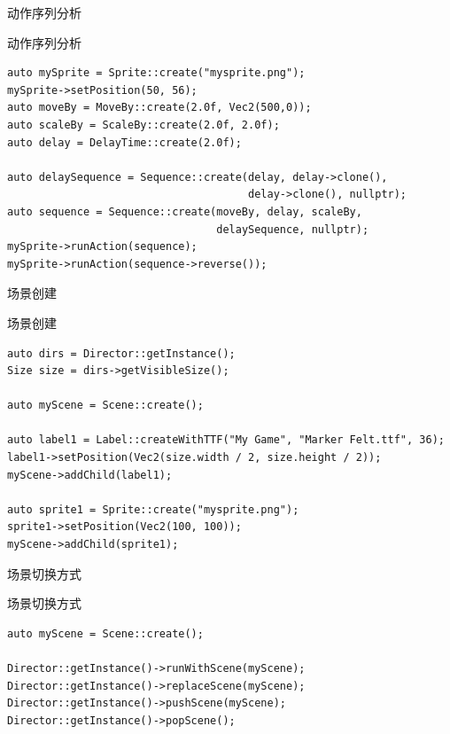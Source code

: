 \documentclass{beamer}
\begin{document}

\begin{frame}[fragile]{动作序列分析}
\begin{block}{动作序列分析}
\begin{verbatim}
auto mySprite = Sprite::create("mysprite.png");
mySprite->setPosition(50, 56);
auto moveBy = MoveBy::create(2.0f, Vec2(500,0));
auto scaleBy = ScaleBy::create(2.0f, 2.0f);
auto delay = DelayTime::create(2.0f);

auto delaySequence = Sequence::create(delay, delay->clone(),
                                      delay->clone(), nullptr);
auto sequence = Sequence::create(moveBy, delay, scaleBy,
                                 delaySequence, nullptr);
mySprite->runAction(sequence);
mySprite->runAction(sequence->reverse());
\end{verbatim}
\end{block}
\end{frame}


\begin{frame}[fragile]{场景创建}
\begin{block}{场景创建}
\begin{verbatim}
auto dirs = Director::getInstance();
Size size = dirs->getVisibleSize();

auto myScene = Scene::create();

auto label1 = Label::createWithTTF("My Game", "Marker Felt.ttf", 36);
label1->setPosition(Vec2(size.width / 2, size.height / 2));
myScene->addChild(label1);

auto sprite1 = Sprite::create("mysprite.png");
sprite1->setPosition(Vec2(100, 100));
myScene->addChild(sprite1);
\end{verbatim}
\end{block}
\end{frame}


\begin{frame}[fragile]{场景切换方式}
\begin{block}{场景切换方式}
\begin{verbatim}
auto myScene = Scene::create();

Director::getInstance()->runWithScene(myScene);
Director::getInstance()->replaceScene(myScene);
Director::getInstance()->pushScene(myScene);
Director::getInstance()->popScene();
\end{verbatim}
\end{block}
\end{frame}
\end{document}
